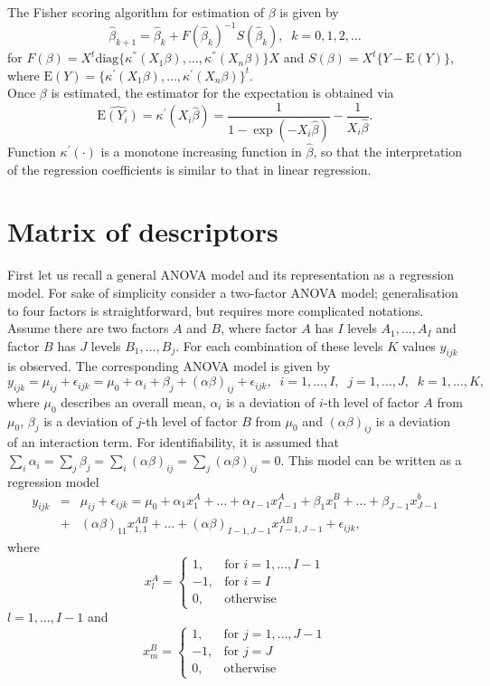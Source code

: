 \documentclass[12pt]{article}
\def\E{\mbox{E}}
\def\beqn{\begin{eqnarray*}}
\def\eeqn{\end{eqnarray*}}
\begin{document}
The Fisher scoring algorithm for estimation of $\beta$ is given by
$$
\hat\beta_{k+1}=\hat\beta_k+F(\hat\beta_k)^{-1}S(\hat\beta_k),\;\;k=0,1,2,\ldots
$$
for $F(\beta)=X^t\mbox{diag}\{\kappa^{''}(X_1\beta),\ldots,\kappa^{''}(X_n\beta)\}X$ and $S(\beta)=X^t\{Y-\E(Y)\}$, where $\E(Y)=\{\kappa^{'}(X_1\beta),\ldots,\kappa^{'}(X_n\beta)\}^t$. \\
Once $\beta$ is estimated, the estimator for the expectation is obtained via
$$
\widehat{\E(Y_i)}=\kappa^{'}(X_i\hat\beta)=\frac{1}{1-\exp(-X_i\hat\beta)}-\frac{1}{X_i\hat\beta}.
$$
Function $\kappa^{'}(\cdot)$ is a monotone increasing function in $\hat\beta$, so that the interpretation of the regression coefficients is similar to that in linear regression.
\section{Matrix of descriptors}
\label{subsec:covariates}
First let us recall a general ANOVA model and its representation as a regression model.
For sake of simplicity consider a two-factor ANOVA model; generalisation to four factors is straightforward, but requires more complicated notations. Assume there are two factors $A$ and $B$, where factor $A$ has $I$ levels $A_1,\ldots,A_I$ and factor $B$ has $J$ levels $B_1,\ldots,B_j$. For each combination of these levels $K$ values $y_{ijk}$ is observed. The corresponding ANOVA model is given by
$$
y_{ijk}=\mu_{ij}+\epsilon_{ijk}=\mu_0+\alpha_i+\beta_j+(\alpha\beta)_{ij}+\epsilon_{ijk},\;\;i=1,\ldots,I,\;\;j=1,\ldots,J,\;\;k=1,\ldots,K,
$$
where $\mu_0$ describes an overall mean, $\alpha_i$ is a deviation of $i$-th level of factor $A$ from $\mu_0$, $\beta_j$ is a deviation of $j$-th level of factor $B$ from $\mu_0$ and $(\alpha\beta)_{ij}$ is a deviation of an interaction term. For identifiability, it is assumed that $\sum_i\alpha_i=\sum_j\beta_j=\sum_{i}(\alpha\beta)_{ij}=\sum_{j}(\alpha\beta)_{ij}=0$. 
This model can be written as a regression model 
\beqn 
y_{ijk}&=&\mu_{ij}+\epsilon_{ijk}=\mu_0+\alpha_1 x_1^A+\ldots+\alpha_{I-1}x_{I-1}^A+\beta_1x_1^B+\ldots+\beta_{J-1}x_{J-1}^b\\
&+&(\alpha\beta)_{11}x_{1,1}^{AB}+\ldots+(\alpha\beta)_{I-1,J-1}x_{I-1,J-1}^{AB}+\epsilon_{ijk},
\eeqn
where
$$
x_l^A=\begin{cases}
	1,&\mbox{for }i=1,\ldots,I-1\\
	-1,&\mbox{for }i=I\\
	0,&\mbox{otherwise}
\end{cases}
$$
$l=1,\ldots,I-1$ and 
$$
x_m^B=\begin{cases}
	1,&\mbox{for }j=1,\ldots,J-1\\
	-1,&\mbox{for }j=J\\
	0,&\mbox{otherwise}
\end{cases}
$$
\end{document}
